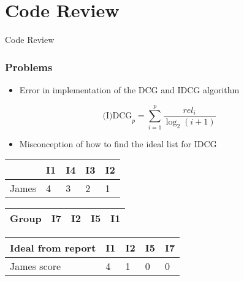 \section{Code Review}

\begin{frame}
     \begin{center}
     	\huge Code Review
     \end{center}
\end{frame}

\begin{frame}
	\frametitle{Problems}
	\begin{itemize}
		\item Error in implementation of the DCG and IDCG algorithm
	\end{itemize}

	\begin{equation}\label{eq:background_dcg}
	\text{(I)DCG}_p = \sum_{i=1}^{p}\frac{\textit{rel}_i}{\log_2(i + 1)}
	\end{equation}	
	
	\begin{itemize}
		\item Misconception of how to find the ideal list for IDCG
	\end{itemize}
	
	\begin{table}[h]
		\centering
		\begin{minipage}{.48\textwidth}\centering
			\begin{tabular}{|l|llll|}
				\hline
						& I1 & I4 & I3  & I2    \\ \hline
				James	& 4  & 3  & 2 	& 1	 	\\ \hline
			\end{tabular}
		\end{minipage}
		\hfill
		\begin{minipage}{.48\textwidth}\centering
			\begin{tabular}{|l|llll|}
				\hline
				Group	& I7 & I2 & I5  & I1    \\ \hline
			\end{tabular}
		\end{minipage}
	\end{table}
	
	\begin{table}[h]
		\begin{tabular}{|l|llll|}
			\hline
			Ideal from report	& I1 & I2 & I5  & I7    \\ \hline
			James score			& 4	 & 1  &	0	& 0		\\
			\hline
		\end{tabular}
	\end{table}
\end{frame}

